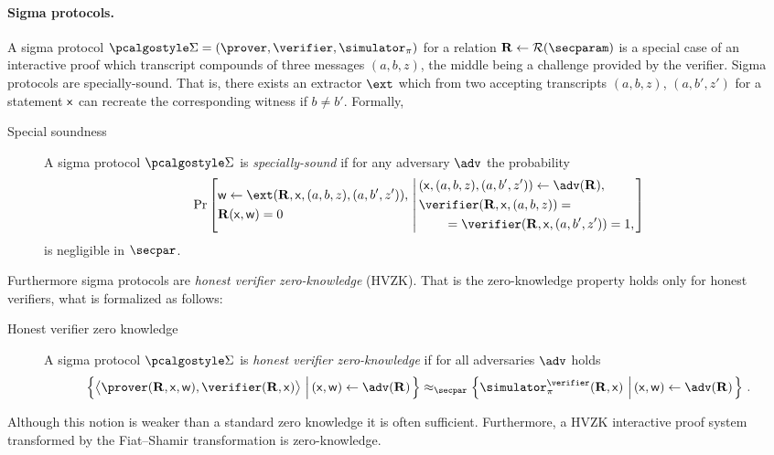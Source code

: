 \documentclass[runningheads,11pt]{llncs}
\theoremstyle{definition}
\begin{document}
\paragraph{Sigma protocols.}
A sigma protocol $\sigmaprot = (\prover, \verifier, \simulator_\zkproof)$  for a relation $\REL \gets \RELGEN(\secparam)$ is a special case of an interactive proof which transcript compounds of three messages $(a, b, z)$, the middle being a challenge provided by the verifier.
Sigma protocols are specially-sound. That is, there exists an extractor $\ext$ which from two accepting transcripts $(a, b, z)$, $(a, b', z')$ for a statement $\mathsf{x}$ can recreate the corresponding witness if $b \neq b'$. Formally,
\begin{description}
	\item[Special soundness] A sigma protocol $\sigmaprot$ is \emph{specially-sound} if for any adversary $\adv$ the probability
	\[
		\Pr\left[
		\begin{aligned}
				& \wit \gets \ext(\REL, \inp, (a, b, z), (a, b', z')),\\
				& \REL(\inp, \wit) = 0
		\end{aligned}
		\,\left|\,
		\begin{aligned}
			& (\inp, (a, b, z), (a, b', z')) \gets \adv(\REL), \\
			& \verifier(\REL, \inp, (a, b, z)) = \\
			& \qquad = \verifier(\REL, \inp, (a, b', z')) = 1, \\
		\end{aligned}
		\right.\right]
	\]
	is negligible in $\secpar$.
\end{description}

Furthermore sigma protocols are \emph{honest verifier zero-knowledge} (HVZK). That is the zero-knowledge property holds only for honest verifiers, what is formalized as follows:
\begin{description}
	\item[Honest verifier zero knowledge] A sigma protocol $\sigmaprot$ is \emph{honest verifier zero-knowledge} if for all adversaries $\adv$ holds
	\begin{multline*}
		\left\{\ip{\prover(\REL, \inp, \wit)}{\verifier(\REL, \inp)} \,\left|\, (\inp, \wit) \gets \adv(\REL)\vphantom{\simulator_\zkproof^\adv}\right.\right\} \approx_\secpar
		\left\{\simulator_\zkproof^{\verifier}(\REL, \inp)\,\left|\, (\inp, \wit) \gets \adv(\REL)\vphantom{\simulator_\zkproof^\adv}\right.\right\}\,.
	\end{multline*}
\end{description}
Although this notion is weaker than a standard zero knowledge it is often sufficient. Furthermore, a HVZK interactive proof system transformed by the Fiat--Shamir transformation is zero-knowledge.
\end{document}

